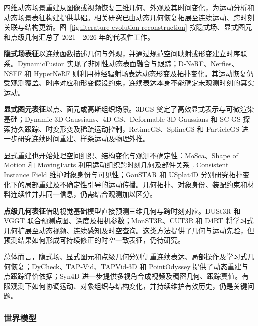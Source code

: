 四维动态场景重建从图像或视频恢复三维几何、外观及其时间变化，为运动分析和动态场景表征构建提供基础。相关研究已由动态几何恢复拓展至连续运动、跨时刻关联与结构更新\cite{cndynamic2024,cnnerf2025,cndynamicgs2026}。图~\ref{fig:literature-evolution-reconstruction} 按隐式场、显式图元和点级几何汇总了 2021—2026 年的代表性工作。

\textbf{隐式场表征}以连续函数描述几何与外观，并通过规范空间映射或形变建立时序联系。DynamicFusion 实现了非刚性动态表面融合与跟踪\cite{dynamicfusion2015}；D-NeRF、Nerfies、NSFF 和 HyperNeRF 则利用神经辐射场表达动态形变及拓扑变化\cite{nerf2020,dnerf2021,nerfies2021,nsff2021,hypernerf2021}。其运动恢复仍受观测覆盖、时序对应和形变假设约束，连续表达本身不能确定未观测时刻的真实运动。

\textbf{显式图元表征}以点、面元或高斯组织场景。3DGS 奠定了高效显式表示与可微渲染基础\cite{gs2023}；Dynamic 3D Gaussians、4D-GS、Deformable 3D Gaussians 和 SC-GS 探索持久跟踪、时变形变及稀疏运动控制\cite{dynamicgs2024,gs4d2024,deformablegs2024,scgs2024}，RetimeGS、SplineGS 和 ParticleGS 进一步研究连续时间重建、样条运动及物理外推\cite{retimegs2026,splinegs2025,particlegs2026}。

显式重建也开始处理空间组织、结构变化与观测不确定性：MoSca、Shape of Motion 和 MovingParts 利用运动组织跨时刻几何及部件关系\cite{ref05,shapeofmotion2025,movingparts2024}；Consistent Instance Field 维护对象身份与可见性\cite{consistentinstance2026}；GauSTAR 和 USplat4D 分别研究拓扑变化下的局部重建及不确定性引导的运动传播\cite{gaustar2025,usplat4d2026}。几何拓扑、对象身份、装配约束和材料连续性并非同一信息，仍需结合观测加以区分。

\textbf{点级几何表征}借助视觉基础模型直接预测三维几何与跨时刻对应。DUSt3R 和 VGGT 联合预测点图、深度及相机参数\cite{dust3r2024,vggt2025}；MonST3R、CUT3R 和 D4RT 将学习式几何扩展至动态视频、连续感知及时空查询\cite{monst3r2025,cut3r2025,d4rt2026}。这类方法提供了几何与运动先验，但预测结果如何形成可持续修正的时空一致表征，仍待研究。

总体而言，隐式场、显式图元和点级几何分别侧重连续表达、局部操作及学习式几何恢复；DyCheck、TAP-Vid、TAPVid-3D 和 PointOdyssey 提供了动态重建与点跟踪评价依据\cite{dycheck2022,tapvid2022,tapvid3d2024,pointodyssey2023}；Syn4D 进一步提供多视角合成视频及稠密几何、跟踪真值\cite{syn4d2026}。有限观测下如何协调运动、对象组织与结构变化，并持续维护有效历史，仍是关键问题。


\subsubsection{世界模型}


